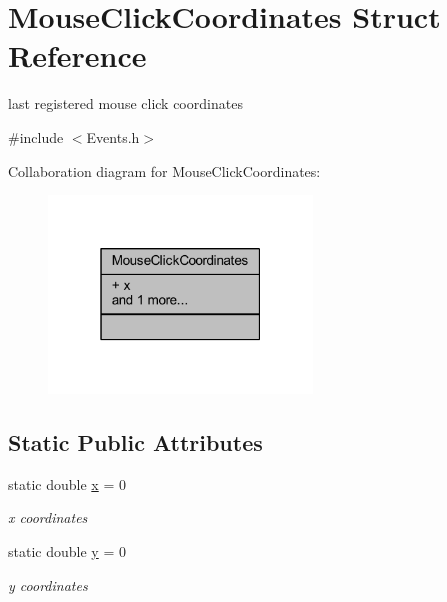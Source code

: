\hypertarget{struct_mouse_click_coordinates}{}\section{Mouse\+Click\+Coordinates Struct Reference}
\label{struct_mouse_click_coordinates}


last registered mouse click coordinates  




{\ttfamily \#include $<$Events.\+h$>$}



Collaboration diagram for Mouse\+Click\+Coordinates\+:
\nopagebreak
\begin{figure}[H]
\begin{center}
\leavevmode
\includegraphics[width=199pt]{struct_mouse_click_coordinates__coll__graph}
\end{center}
\end{figure}
\subsection*{Static Public Attributes}
\begin{DoxyCompactItemize}
\item 
\mbox{\label{struct_mouse_click_coordinates_ae2d7c0c719bbe09164c3650819dae696}} 
static double \hyperlink{struct_mouse_click_coordinates_ae2d7c0c719bbe09164c3650819dae696}{x} = 0
\begin{DoxyCompactList}\small\item\em x coordinates \end{DoxyCompactList}\item 
\mbox{\label{struct_mouse_click_coordinates_a093e1fd64d4009d358b00c1e58f20997}} 
static double \hyperlink{struct_mouse_click_coordinates_a093e1fd64d4009d358b00c1e58f20997}{y} = 0
\begin{DoxyCompactList}\small\item\em y coordinates \end{DoxyCompactList}\end{DoxyCompactItemize}


